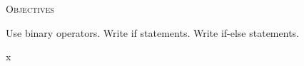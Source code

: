 


\renewcommand\TITLE{Assignment 6}
\usepackage{import}


\topmatter

\textsc{Objectives}
 \begin{myenum}
   \li Use binary operators.
   \li Write if statements.
   \li Write if-else statements.
 \end{myenum}
 

x


